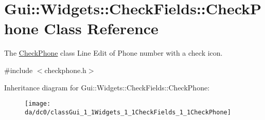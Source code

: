 \hypertarget{classGui_1_1Widgets_1_1CheckFields_1_1CheckPhone}{\section{Gui\-:\-:Widgets\-:\-:Check\-Fields\-:\-:Check\-Phone Class Reference}
\label{classGui_1_1Widgets_1_1CheckFields_1_1CheckPhone}
}


The \hyperlink{classGui_1_1Widgets_1_1CheckFields_1_1CheckPhone}{Check\-Phone} class Line Edit of Phone number with a check icon.  




{\ttfamily \#include $<$checkphone.\-h$>$}

Inheritance diagram for Gui\-:\-:Widgets\-:\-:Check\-Fields\-:\-:Check\-Phone\-:\begin{figure}[H]
\begin{center}
\leavevmode
\texttt{[image: da/dc0/classGui\_1\_1Widgets\_1\_1CheckFields\_1\_1CheckPhone]}
\end{center}
\end{figure}
